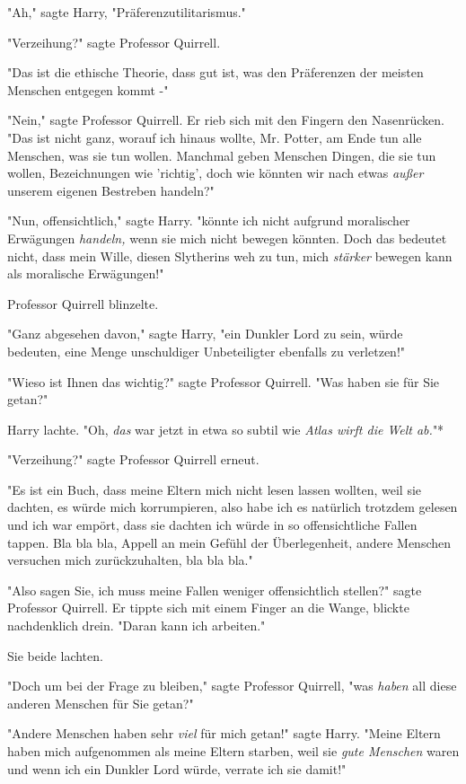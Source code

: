 {"Ah," sagte Harry, "Präferenzutilitarismus."

"Verzeihung?" sagte Professor Quirrell.

"Das ist die ethische Theorie, dass gut ist, was den Präferenzen der meisten Menschen entgegen kommt -"

"Nein," sagte Professor Quirrell. Er rieb sich mit den Fingern den Nasenrücken. "Das ist nicht ganz, worauf ich hinaus wollte, Mr. Potter, am Ende tun alle Menschen, was sie tun wollen. Manchmal geben Menschen Dingen, die sie tun wollen, Bezeichnungen wie 'richtig', doch wie könnten wir nach etwas \emph{außer} unserem eigenen Bestreben handeln?"

"Nun, offensichtlich," sagte Harry. "könnte ich nicht aufgrund moralischer Erwägungen \emph{handeln,} wenn sie mich nicht bewegen könnten. Doch das bedeutet nicht, dass mein Wille, diesen Slytherins weh zu tun, mich \emph{stärker} bewegen kann als moralische Erwägungen!"

Professor Quirrell blinzelte.

"Ganz abgesehen davon," sagte Harry, "ein Dunkler Lord zu sein, würde bedeuten, eine Menge unschuldiger Unbeteiligter ebenfalls zu verletzen!"

"Wieso ist Ihnen das wichtig?" sagte Professor Quirrell. "Was haben sie für Sie getan?"

Harry lachte. "Oh, \emph{das} war jetzt in etwa so subtil wie \emph{Atlas wirft die Welt ab.}"*

"Verzeihung?" sagte Professor Quirrell erneut.

"Es ist ein Buch, dass meine Eltern mich nicht lesen lassen wollten, weil sie dachten, es würde mich korrumpieren, also habe ich es natürlich trotzdem gelesen und ich war empört, dass sie dachten ich würde in so offensichtliche Fallen tappen. Bla bla bla, Appell an mein Gefühl der Überlegenheit, andere Menschen versuchen mich zurückzuhalten, bla bla bla."

"Also sagen Sie, ich muss meine Fallen weniger offensichtlich stellen?" sagte Professor Quirrell. Er tippte sich mit einem Finger an die Wange, blickte nachdenklich drein. "Daran kann ich arbeiten."

Sie beide lachten.

"Doch um bei der Frage zu bleiben," sagte Professor Quirrell, "was \emph{haben} all diese anderen Menschen für Sie getan?"

"Andere Menschen haben sehr \emph{viel} für mich getan!" sagte Harry. "Meine Eltern haben mich aufgenommen als meine Eltern starben, weil sie \emph{gute Menschen} waren und wenn ich ein Dunkler Lord würde, verrate ich sie damit!"

}
